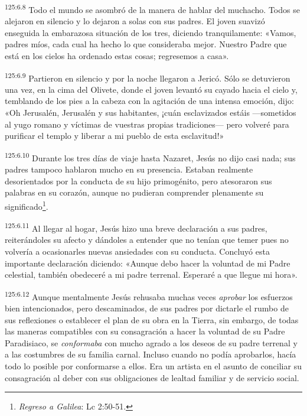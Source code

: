 \par 
\textsuperscript{125:6.8} Todo el mundo se asombró de la manera de hablar del muchacho. Todos se alejaron en silencio y lo dejaron a solas con sus padres. El joven suavizó enseguida la embarazosa situación de los tres, diciendo tranquilamente: «Vamos, padres míos, cada cual ha hecho lo que consideraba mejor. Nuestro Padre que está en los cielos ha ordenado estas cosas; regresemos a casa».

\par 
\textsuperscript{125:6.9} Partieron en silencio y por la noche llegaron a Jericó. Sólo se detuvieron una vez, en la cima del Olivete, donde el joven levantó su cayado hacia el cielo y, temblando de los pies a la cabeza con la agitación de una intensa emoción, dijo: «Oh Jerusalén, Jerusalén y sus habitantes, ¡cuán esclavizados estáis ---sometidos al yugo romano y víctimas de vuestras propias tradiciones--- pero volveré para purificar el templo y liberar a mi pueblo de esta esclavitud!»

\par 
\textsuperscript{125:6.10} Durante los tres días de viaje hasta Nazaret, Jesús no dijo casi nada; sus padres tampoco hablaron mucho en su presencia. Estaban realmente desorientados por la conducta de su hijo primogénito, pero atesoraron sus palabras en su corazón, aunque no pudieran comprender plenamente su significado\footnote{\textit{Regreso a Galilea}: Lc 2:50-51.}.

\par 
\textsuperscript{125:6.11} Al llegar al hogar, Jesús hizo una breve declaración a sus padres, reiterándoles su afecto y dándoles a entender que no tenían que temer pues no volvería a ocasionarles nuevas ansiedades con su conducta. Concluyó esta importante declaración diciendo: «Aunque debo hacer la voluntad de mi Padre celestial, también obedeceré a mi padre terrenal. Esperaré a que llegue mi hora».

\par 
\textsuperscript{125:6.12} Aunque mentalmente Jesús rehusaba muchas veces \textit{aprobar} los esfuerzos bien intencionados, pero descaminados, de sus padres por dictarle el rumbo de sus reflexiones o establecer el plan de su obra en la Tierra, sin embargo, de todas las maneras compatibles con su consagración a hacer la voluntad de su Padre Paradisiaco, se \textit{conformaba} con mucho agrado a los deseos de su padre terrenal y a las costumbres de su familia carnal. Incluso cuando no podía aprobarlos, hacía todo lo posible por conformarse a ellos. Era un artista en el asunto de conciliar su consagración al deber con sus obligaciones de lealtad familiar y de servicio social.

